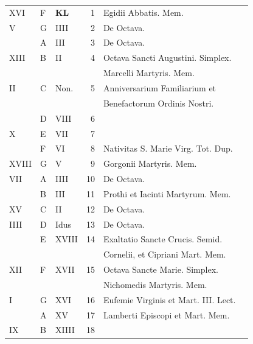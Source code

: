 \begin{center}
\begin{tabular}{l | l | l | r | l l}
\color{Red} XVI & F & \textbf{\color{Red} K\color{Blue}L} & 1 & Egidii Abbatis. Mem. & \color{Red} \\
\color{Red} V & G & \color{Red} IIII & 2 & De Octava. \\
\color{Red}  & \color{Red} A & \color{Red} III & 3 & De Octava. & \color{Red} \\
\color{Red} XIII & B & \color{Red} II & 4 & Octava Sancti Augustini. Simplex. & \color{Red} \\
& & & & \quad Marcelli Martyris. Mem. \\
\color{Red} II & C & \color{Red} Non. & 5 & Anniversarium Familiarium et & \color{Red} \\
& & & & \quad Benefactorum Ordinis Nostri. \\
\color{Red}  & D & \color{Red} VIII & 6 & & \color{Red} \\
\color{Red} X & E & \color{Red} VII & 7 & & \color{Red} \\
\color{Red}  & F & \color{Red} VI & 8 & \multicolumn{2}{l}{\color{Red} Nativitas S. Marie Virg. Tot. Dup.} \\
\color{Red} XVIII & G & \color{Red} V & 9 & Gorgonii Martyris. \color{Red} Mem. \\
\color{Red} VII & \color{Red} A & \color{Red} IIII & 10 & De Octava. & \color{Red} \\
\color{Red}  & B & \color{Red} III & 11 & \color{Red} Prothi et Iacinti Martyrum. Mem. \\
\color{Red} XV & C & \color{Red} II & 12 & De Octava. & \color{Red} \\
\color{Red} IIII & D & \color{Red} Idus & 13 & De Octava. & \color{Red} \\
\color{Red}  & E & \color{Red} XVIII & 14 & Exaltatio Sancte Crucis. Semid. \\
& & & & \multicolumn{2}{l}{\quad Cornelii, et Cipriani Mart. Mem.} \\
\color{Red} XII & F & \color{Red} XVII & 15 & Octava Sancte Marie. Simplex. & \color{Red} \\
& & & & \quad Nichomedis Martyris. Mem. \\
\color{Red} I & G & \color{Red} XVI & 16 & Eufemie Virginis et Mart. III. Lect. & \color{Red} \\
\color{Red}  & \color{Red} A & \color{Red} XV & 17 & Lamberti Episcopi et Mart. Mem. \\
\color{Red} IX & B & \color{Red} XIIII & 18 & & \color{Red} \\

\end{tabular}
\end{center}
